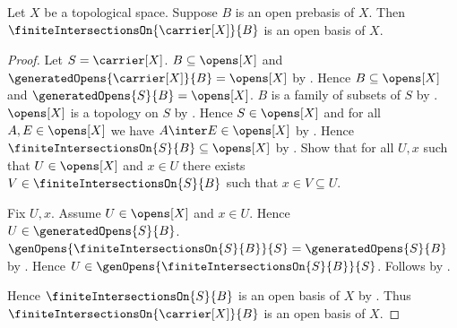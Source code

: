 \begin{theorem}\label{finite_intersections_of_open_prebasis_form_open_basis}
    Let $X$ be a topological space.
    Suppose $B$ is an open prebasis of $X$.
    Then $\finiteIntersectionsOn{\carrier[X]}{B}$ is an open basis of $X$.
\end{theorem}
\begin{proof}
    Let $S=\carrier[X]$.
    $B\subseteq\opens[X]$ and
        $\generatedOpens{\carrier[X]}{B}=\opens[X]$ by
        .
    Hence $B\subseteq\opens[X]$ and
        $\generatedOpens{S}{B}=\opens[X]$.
    $B$ is a family of subsets of $S$ by
        .
    $\opens[X]$ is a topology on $S$ by
        .
    Hence $S\in\opens[X]$ and
        for all $A,E\in\opens[X]$ we have $A\inter E\in\opens[X]$ by
        .
    Hence $\finiteIntersectionsOn{S}{B}\subseteq\opens[X]$ by
        .
    Show that for all $U,x$ such that $U\in\opens[X]$ and $x\in U$
        there exists $V\in\finiteIntersectionsOn{S}{B}$ such that
            $x\in V\subseteq U$.
    \begin{subproof}
        Fix $U,x$.
        Assume $U\in\opens[X]$ and $x\in U$.
        Hence $U\in\generatedOpens{S}{B}$.
        $\genOpens{\finiteIntersectionsOn{S}{B}}{S}
            =\generatedOpens{S}{B}$ by
            .
        Hence $U\in\genOpens{\finiteIntersectionsOn{S}{B}}{S}$.
        Follows by .
    \end{subproof}
    Hence $\finiteIntersectionsOn{S}{B}$ is an open basis of $X$ by
        .
    Thus $\finiteIntersectionsOn{\carrier[X]}{B}$ is an open basis of $X$.
\end{proof}

